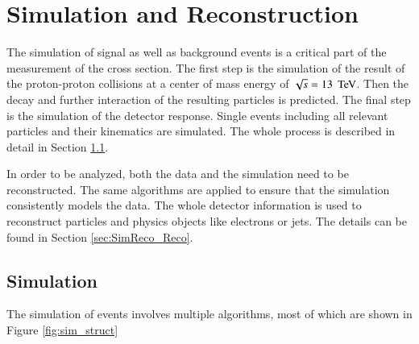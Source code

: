 
\chapter{Simulation and Reconstruction}

The simulation of signal as well as background events is a critical part of the measurement
of the \ttbar cross section. The first step is the simulation of the result of the proton-proton 
collisions at a center of mass energy of $\sqrt{s} = 13 \; \,\text{Te\hspace{-.08em}V}$. Then the decay and further interaction 
of the resulting particles is predicted. The final step is the simulation of the detector response.
Single events including all relevant particles and their kinematics are simulated.
The whole process is described in detail in Section \ref{sec:SimReco_Sim}.

In order to be analyzed, both the data and the simulation need to be reconstructed. The same algorithms are applied to ensure
that the simulation consistently models the data. 
The whole detector information is used to reconstruct particles and physics objects like electrons or jets.
The details can be found in Section \ref{sec:SimReco_Reco}. 


\section{Simulation}
\label{sec:SimReco_Sim}

The simulation of events involves multiple algorithms, most of which are shown in Figure \ref{fig:sim_struct}

